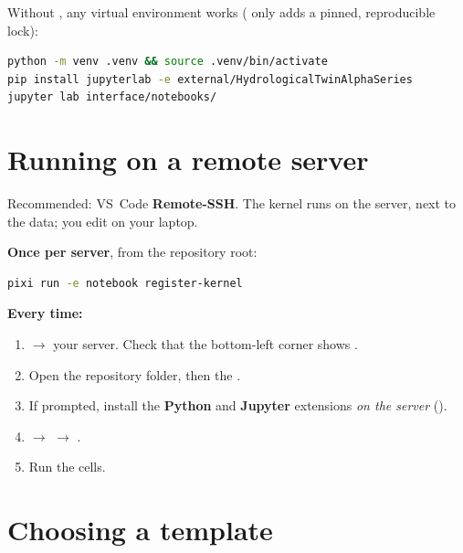 Without , any virtual environment works ( only adds a pinned, reproducible lock):

\begin{lstlisting}[language=bash]
python -m venv .venv && source .venv/bin/activate
pip install jupyterlab -e external/HydrologicalTwinAlphaSeries
jupyter lab interface/notebooks/
\end{lstlisting}

\section{Running on a remote server}

Recommended: VS~Code \textbf{Remote-SSH}. The kernel runs on the server, next to the data; you edit on your laptop.

\textbf{Once per server}, from the repository root:
\begin{lstlisting}[language=bash]
pixi run -e notebook register-kernel
\end{lstlisting}

\textbf{Every time:}
\begin{enumerate}
    \item {} $\rightarrow$ your server. Check that the bottom-left corner shows .
    \item Open the repository folder, then the .
    \item If prompted, install the \textbf{Python} and \textbf{Jupyter} extensions \emph{on the server} ().
    \item {} $\rightarrow$  $\rightarrow$ .
    \item Run the cells.
\end{enumerate}



\section{Choosing a template}

